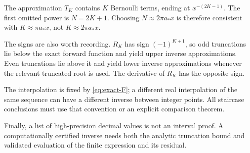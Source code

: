 \documentclass[11pt,a4paper]{article}
\numberwithin{equation}{section}
\theoremstyle{definition}\newtheorem{definition}[theorem]{Definition}
\theoremstyle{remark}\newtheorem{remark}[theorem]{Remark}
\begin{document}
The approximation $T_K$ contains $K$ Bernoulli terms, ending at $x^{-(2K-1)}$.
The first omitted power is $N=2K+1$. Choosing $N\approx2\pi a_*x$ is therefore
consistent with $K\approx\pi a_*x$, not $K\approx2\pi a_*x$.

The signs are also worth recording. $R_K$ has sign $(-1)^{K+1}$, so odd
truncations lie below the exact forward function and yield upper inverse
approximations. Even truncations lie above it and yield lower inverse
approximations whenever the relevant truncated root is used. The derivative
of $R_K$ has the opposite sign.

The interpolation is fixed by \eqref{eq:exact-F}; a different real
interpolation of the same sequence can have a different inverse between
integer points. All staircase conclusions must use that convention or an
explicit comparison theorem.

Finally, a list of high-precision decimal values is not an interval proof.
A computationally certified inverse needs both the analytic truncation
bound and validated evaluation of the finite expression and its residual.
\end{document}
